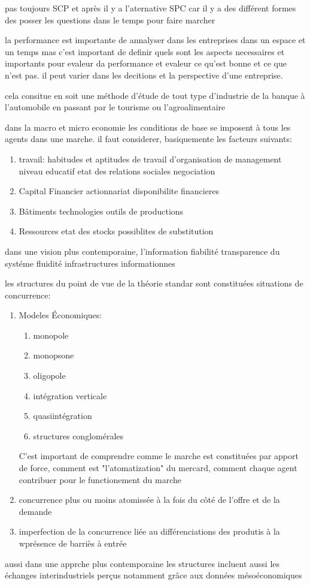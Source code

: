 \documentclass{article}
\begin{document}
pas toujours SCP et après il y a l'aternative SPC car il y a des différent formes des posser les questions dans le temps pour faire marcher 

la performance est importante de annalyser dans les entreprises dans un espace et un temps mas c'est important de definir quels sont les aspects necessaires et importants pour evaleur da performance et evaleur ce qu'est bonne et ce que n'est pas. il peut varier dans les decitions et la perspective d'une entreprise.

cela consitue en soit une méthode d'étude de tout type d'industrie de la banque à l'automobile en passant par le tourisme ou l'agroalimentaire


dans la macro et micro economie 
les conditions de base se imposent à tous les agents dans une marche. il faut considerer, basiquemente les facteurs suivants:
\begin{enumerate}
    \item travail: 
        habitudes et aptitudes de travail d'organisation
        de management
        niveau educatif
        etat des relations sociales
        negociation
    \item Capital Financier
        actionnariat
        disponibilite financieres
    \item Bâtiments
        technologies
        outils de productions
    \item Ressources
        etat des stocks
        possiblites de substitution
\end{enumerate}

dans une vision plus contemporaine, l'information fiabilité transparence du systéme fluidité infrastructures informationnes

les structures du point de vue de la théorie standar sont constituées situations de concurrence:
\begin{enumerate}
    \item Modeles Économiques:
    \begin{enumerate}
        \item monopole
        \item monopsone
        \item oligopole
        \item intégration verticale
        \item quasiintégration
        \item structures conglomérales
    \end{enumerate}
    C'est important de comprendre comme le marche est constituées par apport de force, comment est "l'atomatization" du mercard, comment chaque agent contribuer pour le functionement du marche
    \item concurrence plus ou moins atomissée à la fois du côté de l'offre et de la demande
    \item imperfection de la concurrence liée au différenciations des produtis à la wprésence de barriès à entrée
\end{enumerate}
aussi dans une apprche plus contemporaine les structures incluent aussi les échanges interindustriels perçus notamment grâce aux données mésoéconomiques
\end{document}
